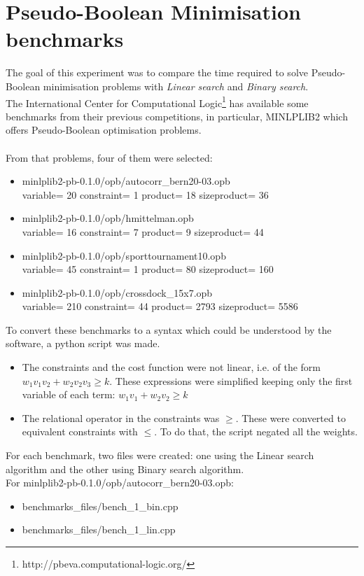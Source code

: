 \section{Pseudo-Boolean Minimisation benchmarks}

The goal of this experiment was to compare the time required to solve Pseudo-Boolean minimisation problems with \emph{Linear search} and \emph{Binary search}.\\
The International Center for Computational Logic\footnote{http://pbeva.computational-logic.org/} has available some benchmarks from their previous competitions, in particular, MINLPLIB2 which offers Pseudo-Boolean optimisation problems. \\\\
From that problems, four of them were selected:
\begin{itemize}
	\item minlplib2-pb-0.1.0/opb/autocorr\_bern20-03.opb\\ variable= 20 constraint= 1 product= 18 sizeproduct= 36
	\item minlplib2-pb-0.1.0/opb/hmittelman.opb\\ variable= 16 constraint= 7 product= 9 sizeproduct= 44
	\item minlplib2-pb-0.1.0/opb/sporttournament10.opb\\ variable= 45 constraint= 1 product= 80 sizeproduct= 160
	\item minlplib2-pb-0.1.0/opb/crossdock\_15x7.opb\\ variable= 210 constraint= 44 product= 2793 sizeproduct= 5586
\end{itemize}
To convert these benchmarks to a syntax which could be understood by the software, a python script was made.
\begin{itemize}
	\item The constraints and the cost function were not linear, i.e. of the form $w_1 v_1 v_2 + w_2 v_2 v_3 \geq k$. These expressions were simplified keeping only the first variable of each term: $w_1 v_1+ w_2 v_2 \geq k$ 
	\item The relational operator in the constraints was $\geq$. These were converted to equivalent constraints with $\leq$. To do that, the script negated all the weights. 
\end{itemize}
For each benchmark, two files were created: one using the Linear search algorithm and the other using Binary search algorithm.\\
For minlplib2-pb-0.1.0/opb/autocorr\_bern20-03.opb:
\begin{itemize}
	\item benchmarks\_files/bench\_1\_bin.cpp
	\item benchmarks\_files/bench\_1\_lin.cpp
\end{itemize}

